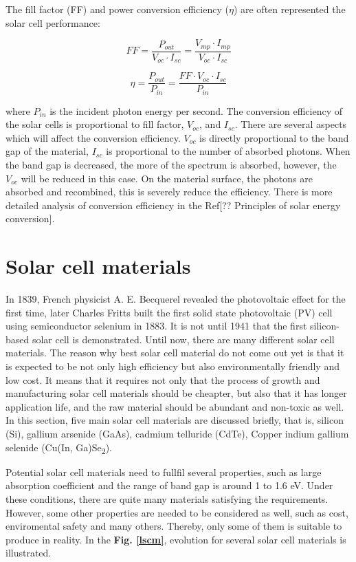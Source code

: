 \documentclass[a4paper, 12pt, titlepage,oneside,drop]{kthesis}
\begin{document}
The fill factor (FF) and power conversion efficiency ($\eta$) are often represented the solar cell performance:

\begin{equation}
FF=\frac{P_{out}}{V_{oc} \cdot I_{sc}} = \frac{V_{mp} \cdot I_{mp}}{V_{oc} \cdot I_{sc}}
\end{equation}

\begin{equation}
\eta =\frac{P_{out}}{P_{in}} = \frac{FF \cdot V_{oc} \cdot I_{sc}}{P_{in}}
\end{equation}

where $P_{in}$ is the incident photon energy per second. The conversion efficiency of the solar cells is proportional to fill factor, $V_{oc}$, and $I_{sc}$. There are several aspects which will affect
the conversion efficiency. $V_{oc}$ is directly proportional to the band gap of the material, $I_{sc}$ is proportional to the number of absorbed photons. When the band gap is decreased, the more of the spectrum is absorbed, however, 
the $V_{oc}$ will be reduced in this case. On the material surface, the photons are absorbed and recombined, this is severely reduce the efficiency. There is more detailed analysis of conversion efficiency in the Ref[?? Principles of solar energy conversion].


\section{Solar cell materials}

In 1839,  French physicist A. E. Becquerel revealed the photovoltaic effect for the first time, later Charles Fritts built the first solid state photovoltaic (PV) cell using semiconductor selenium in 1883.
It is not until 1941 that the first silicon-based solar cell is demonstrated. Until now, there are many different solar cell materials. The reason why 
best solar cell material do not come out yet is that it is expected to be not only high efficiency but also environmentally friendly and 
low cost. It means that it requires not only that the process of growth and manufacturing solar cell materials should be cheapter, but also that it has longer application life, and the raw material should be abundant and non-toxic as well. In this section,
five main solar cell materials are discussed briefly, that is, silicon (Si), gallium arsenide (GaAs), cadmium telluride (CdTe), Copper indium gallium selenide (Cu(In, Ga)Se\textsubscript{2}).

Potential solar cell materials need to fullfil several properties, such as large absorption coefficient and the range of band gap is around 1 to 1.6 eV. Under these conditions, there 
are quite many materials satisfying the requirements. However, some other properties are needed to be considered as well, such as cost, enviromental safety
and many others. Thereby, only some of them is suitable to produce in reality. In the \textbf{Fig. \ref{lscm}}, evolution for several solar cell materials is illustrated. 
\end{document}
